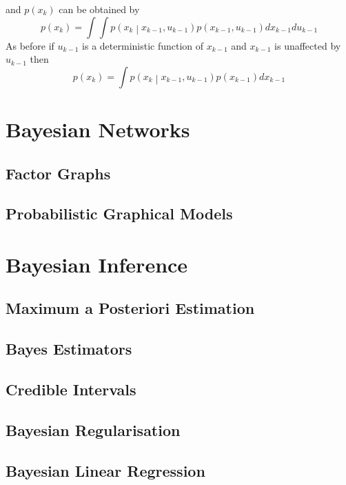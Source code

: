 \documentclass[11pt]{report} %
\begin{document}
and $p\left(x_{k}\right)$ can be obtained by
\begin{equation}
p\left(x_{k}\right) = \int\int p\left(x_{k}\middle|x_{k - 1}, u_{k - 1}\right)p\left(x_{k - 1}, u_{k - 1}\right)dx_{k - 1}du_{k - 1}
\end{equation}
As before if $u_{k - 1}$ is a deterministic function of $x_{k - 1}$ and $x_{k - 1}$ is unaffected by $u_{k - 1}$ then
\begin{equation}
p\left(x_{k}\right) = \int p\left(x_{k}\middle|x_{k - 1}, u_{k - 1}\right)p\left(x_{k - 1}\right)dx_{k - 1}
\end{equation}

\section{Bayesian Networks}

\subsection{Factor Graphs}

\subsection{Probabilistic Graphical Models}

\section{Bayesian Inference}

\subsection{Maximum a Posteriori Estimation}

\subsection{Bayes Estimators}

\subsection{Credible Intervals}

\subsection{Bayesian Regularisation}

\subsection{Bayesian Linear Regression \cite{Rasmussen2006}}
\end{document}
